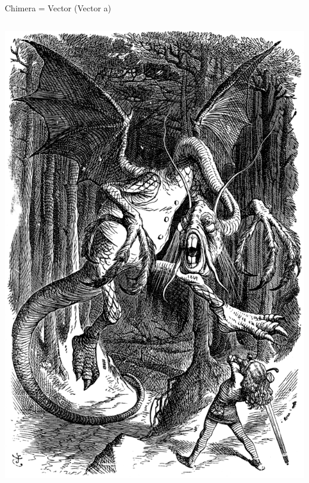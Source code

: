 \documentclass[handout]{beamer}
\begin{document}
\begin{frame}[fragile]{Chimera = Vector (Vector a)}
\begin{columns}[T]
\begin{column}{.4\textwidth}
  \includegraphics[width=1.18\textwidth]{jabberwocky.png}
\end{column}

\end{columns}

\end{frame}
\end{document}
